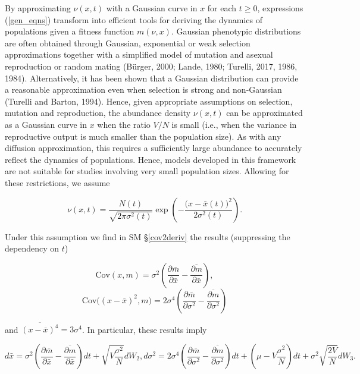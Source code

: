 \documentclass[]{elsarticle} %
\begin{document}
By approximating \(\nu(x,t)\) with a Gaussian curve in \(x\) for each
\(t\geq0\), expressions (\ref{gen_eqns}) transform into efficient tools
for deriving the dynamics of populations given a fitness function
\(m(\nu,x)\). Gaussian phenotypic distributions are often obtained
through Gaussian, exponential or weak selection approximations together
with a simplified model of mutation and asexual reproduction or random
mating (Bürger, 2000; Lande, 1980; Turelli, 2017, 1986, 1984).
Alternatively, it has been shown that a Gaussian distribution can
provide a reasonable approximation even when selection is strong and
non-Gaussian (Turelli and Barton, 1994). Hence, given appropriate
assumptions on selection, mutation and reproduction, the abundance
density \(\nu(x,t)\) can be approximated as a Gaussian curve in \(x\)
when the ratio \(V/N\) is small (i.e., when the variance in reproductive
output is much smaller than the population size). As with any diffusion
approximation, this requires a sufficiently large abundance to
accurately reflect the dynamics of populations. Hence, models developed
in this framework are not suitable for studies involving very small
population sizes. Allowing for these restrictions, we assume

\begin{equation}
\nu(x,t)=\frac{N(t)}{\sqrt{2\pi\sigma^2(t)}}\exp\left(-\frac{\big(x-\bar x(t)\big)^2}{2\sigma^2(t)}\right).
\end{equation}

Under this assumption we find in SM \S\ref{cov2deriv} the results
(suppressing the dependency on \(t\))

\begin{equation}\label{covxm}
\mathrm{Cov}(x,m)=\sigma^2\left(\frac{\partial\bar m}{\partial\bar x}-\overline{\frac{\partial m}{\partial\bar x}}\right),
\end{equation} \begin{equation}
\mathrm{Cov}\Big((x-\bar x)^2,m\Big)=2\sigma^4\left(\frac{\partial\bar m}{\partial\sigma^2}-\overline{\frac{\partial m}{\partial\sigma^2}}\right)
\end{equation}

and \(\overline{(x-\bar x)^4}=3\sigma^4\). In particular, these results
imply

\begin{subequations}\label{no_inher}
\begin{equation}\label{xbar}
d\bar x=\sigma^2\left(\frac{\partial\bar m}{\partial\bar x}-\overline{\frac{\partial m}{\partial\bar x}}\right)dt+\sqrt{V\frac{\sigma^2}{N}}dW_2,
\end{equation}
\begin{equation}\label{G}
d\sigma^2=2\sigma^4\left(\frac{\partial\bar m}{\partial\sigma^2}-\overline{\frac{\partial m}{\partial\sigma^2}}\right)dt +\left(\mu-V\frac{\sigma^2}{N}\right)dt+\sigma^2\sqrt{\frac{2V}{N}}dW_3.
\end{equation}
\end{subequations}
\end{document}

